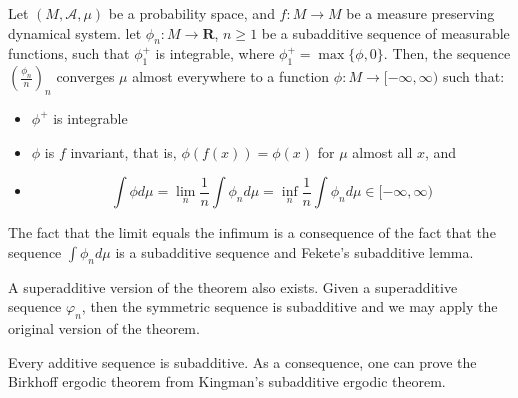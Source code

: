 \documentclass[12pt]{article}
\begin{document}
Let $(M,\mathcal{A},\mu)$ be a probability space, and $f:M\rightarrow M$ be a measure preserving dynamical system. let $\phi_n:M\rightarrow \textbf{R}$, $n\geq 1$ be a subadditive sequence of measurable functions, such that $\phi_1^+$ is integrable, where $\phi_1^+=\max \{\phi,0\}$. Then, the sequence $(\frac{\phi_n}{n})_n$ converges $\mu$ almost everywhere to a function $\phi: M \rightarrow [-\infty,\infty)$ such that:
\begin{itemize}
\item[] $\phi^+$ is integrable
\item[] $\phi$ is $f$ invariant, that is, $\phi(f(x))=\phi(x)$ for $\mu$ almost all $x$, and
\item[] $$\int \phi d\mu = \lim_n \frac{1}{n} \int \phi_n d\mu= \inf_n \frac{1}{n} \int \phi_n d\mu \in [-\infty,\infty)$$
\end{itemize}
The fact that the limit equals the infimum is a consequence of the fact that the sequence $\int \phi_n d\mu$ is a subadditive sequence and Fekete's subadditive lemma. 

A superadditive version of the theorem also exists. Given a superadditive sequence $\varphi_n$, then the symmetric sequence is subadditive and we may apply the original version of the theorem.

Every additive sequence is subadditive. As a consequence, one can prove the Birkhoff ergodic theorem from Kingman's subadditive ergodic theorem.
\end{document}
